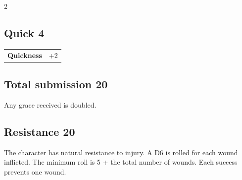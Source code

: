 \begin{multicols}{2}
\begin{tcolorbox}

\end{tcolorbox}

\begin{tcolorbox}
    \subsection*{Quick \hfill \small{4 }}
    \tcblower




\begin{tabular}{@{}ll@{}}
    \textbf{Quickness} & +2\\
\end{tabular}


\end{tcolorbox}

\begin{tcolorbox}
    \subsection*{Total submission \hfill \small{20 }}
    \tcblower
Any grace received is doubled.


\vspace{3mm}



\end{tcolorbox}

\begin{tcolorbox}
    \subsection*{Resistance \hfill \small{20 }}
    \tcblower
The character has natural resistance to injury. A D6 is rolled for each wound inflicted. The minimum roll is 5 + the total number of wounds. Each success prevents one wound.


\vspace{3mm}




\end{tcolorbox}
\end{multicols}
